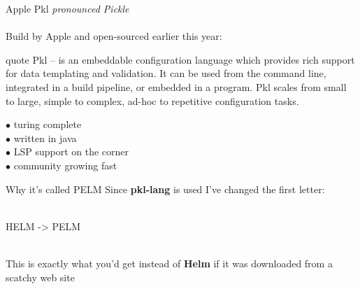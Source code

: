 \documentclass[11pt, aspectratio=169]{beamer}
\begin{document}
\begin{frame}{ Apple Pkl}
	\textit{pronounced Pickle}\\~\\
	Build by Apple and open-sourced earlier this year:

	\begin{block}{quote}
		Pkl -- is an embeddable configuration language which provides rich support
		for data templating and validation. It can be used from the command line,
		integrated in a build pipeline, or embedded in a program. Pkl scales
		from small to large, simple to complex, ad-hoc to repetitive configuration tasks.
	\end{block}

	\begin{description}
		\item [$\bullet$ turing complete]
		\item [$\bullet$ written in java]
		\item [$\bullet$ LSP support on the corner]
		\item [$\bullet$ community growing fast]
	\end{description}
\end{frame}

\begin{frame}{ Why it's called PELM}
	Since \textbf{pkl-lang} is used I've changed the first letter:\\~\\
	\centerline{{\Huge HELM -> PELM}}\\

	This is exactly what you'd get instead of \textbf{Helm} if it was downloaded from a scatchy web site\\~\\
\end{frame}
\end{document}
